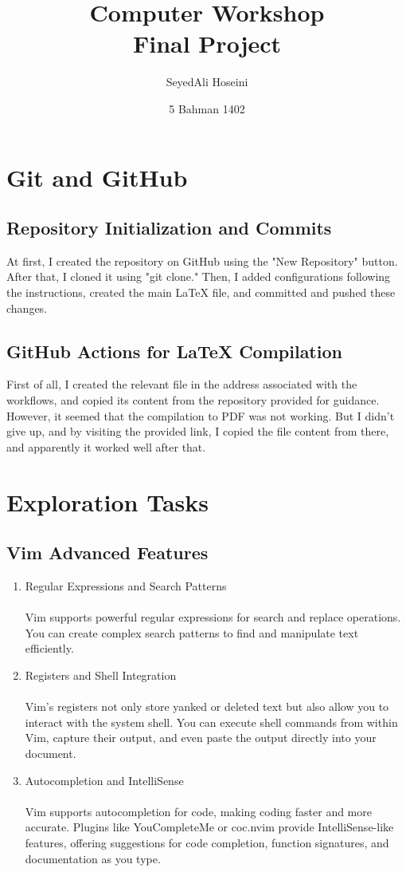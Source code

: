 \documentclass[titlepage]{article}
\title{Computer Workshop\\Final Project}
\author{SeyedAli Hoseini}
\date{5 Bahman 1402}
\begin{document}
\pagestyle{fancy}
\maketitle
\tableofcontents
\newpage
\section{Git and GitHub}
\subsection{Repository Initialization and Commits}
At first, I created the repository on GitHub using the "New Repository" button. After that, I cloned it using "git clone." Then, I added configurations following the instructions, created the main LaTeX file, and committed and pushed these changes.
\subsection{GitHub Actions for LaTeX Compilation}
First of all, I created the relevant file in the address associated with the workflows, and copied its content from the repository provided for guidance. However, it seemed that the compilation to PDF was not working. But I didn't give up, and by visiting the provided link, I copied the file content from there, and apparently it worked well after that.
\newpage
\section{Exploration Tasks}
\subsection{Vim Advanced Features}
\begin{enumerate}
    \item Regular Expressions and Search Patterns\\
    \\Vim supports powerful regular expressions for search and replace operations. You can create complex search patterns to find and manipulate text efficiently.
    \item Registers and Shell Integration\\
    \\Vim's registers not only store yanked or deleted text but also allow you to interact with the system shell. You can execute shell commands from within Vim, capture their output, and even paste the output directly into your document. 
    \item Autocompletion and IntelliSense\\
    \\Vim supports autocompletion for code, making coding faster and more accurate. Plugins like YouCompleteMe or coc.nvim provide IntelliSense-like features, offering suggestions for code completion, function signatures, and documentation as you type.
\end{enumerate}
\end{document}
